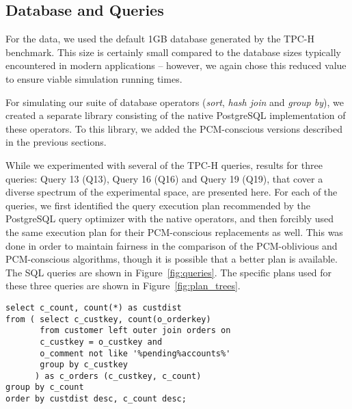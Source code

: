 \subsection{Database and Queries}
For the data, we used the default 1GB database generated by the TPC-H
benchmark.  This size is certainly small compared to the database sizes
typically encountered in modern applications -- however, we again chose
this reduced value to ensure viable simulation running times.

\begin{comment}
Notwithstanding, to ensure that our results were not skewed 
as an outcome,  we used scaled down versions of the hardware simulation parameters
from \cite{wear}, taking care to preserve the size ratios between adjacent
memory devices.
\end{comment}

For simulating our suite of database operators (\textit{sort},
\textit{hash join} and \textit{group by}), we created a separate
library consisting of the native PostgreSQL implementation of these
operators. To this library, we added the PCM-conscious versions described in
the previous sections.


While we experimented with several of the TPC-H queries, results for
three queries: Query 13 (Q13), Query 16 (Q16) and Query 19 (Q19), that
cover a diverse spectrum of the experimental space, are presented here.
For each of the queries, we first identified the query execution plan
recommended by the PostgreSQL query optimizer with the native operators,
and then forcibly used the same execution plan for their PCM-conscious
replacements as well. This was done in order to maintain fairness in the comparison of the PCM-oblivious and PCM-conscious algorithms, though it is possible that a better plan is available. The SQL queries are shown in Figure~\ref{fig:queries}. The specific plans used for these three queries
are shown in Figure~\ref{fig:plan_trees}.

   \lstset{width=\textwidth,
          escapechar=@,
          language=SQL,
          basicstyle=\scriptsize
          }

\newsavebox{\firstlisting}
\begin{lrbox}{\firstlisting}%
\begin{lstlisting}
select c_count, count(*) as custdist
from ( select c_custkey, count(o_orderkey)
       from customer left outer join orders on 
       c_custkey = o_custkey and 
       o_comment not like '%pending%accounts%'
       group by c_custkey
      ) as c_orders (c_custkey, c_count)
group by c_count
order by custdist desc, c_count desc;
\end{lstlisting}
\end{lrbox}

